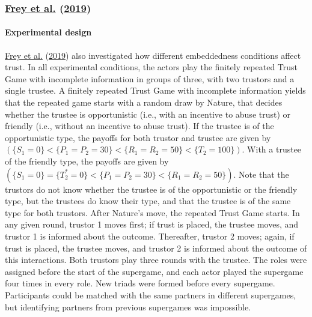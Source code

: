 \documentclass[
  11pt,
]{article}
\begin{document}
\hypertarget{frey_buskens_investments_2019}{%
\subsubsection{\texorpdfstring{\protect\hyperlink{ref-frey_buskens_investments_2019}{Frey et al.} (\protect\hyperlink{ref-frey_buskens_investments_2019}{2019})}{Frey et al. (2019)}}\label{frey_buskens_investments_2019}}

\hypertarget{experimental-design-6}{%
\paragraph{Experimental design}\label{experimental-design-6}}

\protect\hyperlink{ref-frey_buskens_investments_2019}{Frey et al.} (\protect\hyperlink{ref-frey_buskens_investments_2019}{2019}) also investigated how different embeddedness conditions affect trust. In all experimental conditions, the actors play the finitely repeated Trust Game with incomplete information in groups of three, with two trustors and a single trustee. A finitely repeated Trust Game with incomplete information yields that the repeated game starts with a random draw by Nature, that decides whether the trustee is opportunistic (i.e., with an incentive to abuse trust) or friendly (i.e., without an incentive to abuse trust). If the trustee is of the opportunistic type, the payoffs for both trustor and trustee are given by \((\{S_1 = 0\} < \{P_1 = P_2 = 30\} < \{R_1 = R_2 = 50\} < \{T_2 = 100\})\). With a trustee of the friendly type, the payoffs are given by \((\{S_1 = 0\} = \{T_2^{*} = 0\} < \{P_1 = P_2 = 30\} < \{R_1 = R_2 = 50\})\). Note that the trustors do not know whether the trustee is of the opportunistic or the friendly type, but the trustees do know their type, and that the trustee is of the same type for both trustors. After Nature's move, the repeated Trust Game starts. In any given round, trustor 1 moves first; if trust is placed, the trustee moves, and trustor 1 is informed about the outcome. Thereafter, trustor 2 moves; again, if trust is placed, the trustee moves, and trustor 2 is informed about the outcome of this interactions. Both trustors play three rounds with the trustee. The roles were assigned before the start of the supergame, and each actor played the supergame four times in every role. New triads were formed before every supergame. Participants could be matched with the same partners in different supergames, but identifying partners from previous supergames was impossible.
\end{document}
